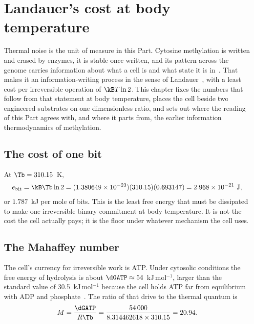 \chapter{Landauer's cost at body temperature}\label{ch:landauer}

Thermal noise is the unit of measure in this Part. Cytosine methylation is written and erased by enzymes, it is stable once written, and its pattern
across the genome carries information about what a cell is and what state it is in~\cite{Sanchez2016}. That makes it an information-writing process in
the sense of Landauer~\cite{Landauer1961}, with a least cost per irreversible operation of $\kB T\ln2$. This chapter fixes the numbers that follow from
that statement at body temperature, places the cell beside two engineered substrates on one dimensionless ratio, and sets out where the
reading of this Part agrees with, and where it parts from, the earlier information thermodynamics of methylation.

\section{The cost of one bit}

At $\Tb=310.15$~K,
\begin{equation}
  e_{\mathrm{bit}}=\kB\Tb\ln2=(1.380649\times10^{-23})(310.15)(0.693147)
  =2.968\times10^{-21}\ \mathrm{J},
  \label{eq:ebit}
\end{equation}
or $1.787$~kJ per mole of bits. \calc{} This is the least free energy that must be dissipated to
make one irreversible binary commitment at body temperature. It is not the cost the cell actually
pays; it is the floor under whatever mechanism the cell uses.

\section{The Mahaffey number}

The cell's currency for irreversible work is ATP. Under cytosolic conditions the free energy of
hydrolysis is about $\dGATP\approx54$~kJ\,mol$^{-1}$, larger than the standard value of
30.5~kJ\,mol$^{-1}$ because the cell holds ATP far from equilibrium with ADP and
phosphate~\cite{Nelson2017}. The ratio of that drive to the thermal quantum is
\begin{equation}
  M=\frac{\dGATP}{R\Tb}=\frac{54\,000}{8.314462618\times310.15}=20.94 .
  \label{eq:M}
\end{equation}
\calc

